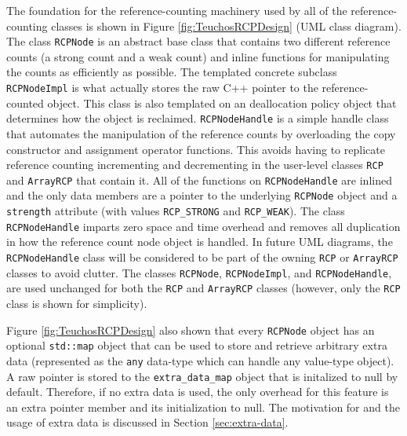 \documentclass[pdf,ps2pdf,11pt]{SANDreport}
\begin{document}
The foundation for the reference-counting machinery used by all of the
reference-counting classes is shown in Figure
{}\ref{fig:TeuchosRCPDesign} (UML class diagram).  The class
{}\texttt{RCPNode} is an abstract base class that contains two
different reference counts (a strong count and a weak count) and
inline functions for manipulating the counts as efficiently as
possible.  The templated concrete subclass {}\texttt{RCPNodeImpl} is
what actually stores the raw C++ pointer to the reference-counted
object.  This class is also templated on an deallocation policy object
that determines how the object is reclaimed.  {}\texttt{RCPNodeHandle}
is a simple handle class that automates the manipulation of the
reference counts by overloading the copy constructor and assignment
operator functions.  This avoids having to replicate reference
counting incrementing and decrementing in the user-level classes
{}\texttt{RCP} and {}\texttt{ArrayRCP} that contain it.  All of the
functions on {}\texttt{RCPNodeHandle} are inlined and the only data
members are a pointer to the underlying {}\texttt{RCPNode} object and
a {}\texttt{strength} attribute (with values {}\texttt{RCP\_STRONG}
and {}\texttt{RCP\_WEAK}).  The class {}\texttt{RCPNodeHandle} imparts
zero space and time overhead and removes all duplication in how the
reference count node object is handled.  In future UML diagrams, the
{}\texttt{RCPNodeHandle} class will be considered to be part of the
owning {}\texttt{RCP} or {}\texttt{ArrayRCP} classes to avoid clutter.
The classes {}\texttt{RCPNode}, {}\texttt{RCPNodeImpl}, and
{}\texttt{RCPNodeHandle}, are used unchanged for both the
{}\texttt{RCP} and {}\texttt{ArrayRCP} classes (however, only the
{}\texttt{RCP} class is shown for simplicity).

Figure {}\ref{fig:TeuchosRCPDesign} also shown that every
{}\texttt{RCPNode} object has an optional {}\texttt{std::map} object
that can be used to store and retrieve arbitrary extra data
(represented as the {}\texttt{any} data-type which can handle any
value-type object).  A raw pointer is stored to the
{}\texttt{extra\_data\_map} object that is initalized to null by
default.  Therefore, if no extra data is used, the only overhead for
this feature is an extra pointer member and its initialization to
null.  The motivation for and the usage of extra data is discussed in
Section {}\ref{sec:extra-data}.
\end{document}
